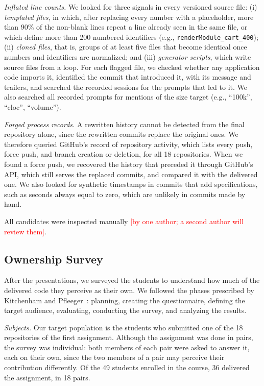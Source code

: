 \documentclass[conference]{IEEEtran}
\newcommand{\tbd}[1]{\textcolor{red}{[#1]}}
\begin{document}
\emph{Inflated line counts.} We looked for three signals in every versioned source file: (i) \emph{templated files}, in which, after replacing every number with a placeholder, more than 90\% of the non-blank lines repeat a line already seen in the same file, or which define more than 200 numbered identifiers (e.g., \texttt{renderModule\_cart\_400}); (ii) \emph{cloned files}, that is, groups of at least five files that become identical once numbers and identifiers are normalized; and (iii) \emph{generator scripts}, which write source files from a loop. For each flagged file, we checked whether any application code imports it, identified the commit that introduced it, with its message and trailers, and searched the recorded sessions for the prompts that led to it. We also searched all recorded prompts for mentions of the size target (e.g., ``100k'', ``cloc'', ``volume'').

\emph{Forged process records.} A rewritten history cannot be detected from the final repository alone, since the rewritten commits replace the original ones. We therefore queried GitHub's record of repository activity, which lists every push, force push, and branch creation or deletion, for all 18 repositories. When we found a force push, we recovered the history that preceded it through GitHub's API, which still serves the replaced commits, and compared it with the delivered one. We also looked for synthetic timestamps in commits that add specifications, such as seconds always equal to zero, which are unlikely in commits made by hand.

All candidates were inspected manually \tbd{by one author; a second author will review them}.

\subsection{Ownership Survey}

After the presentations, we surveyed the students to understand how much of the delivered code they perceive as their own. We followed the phases prescribed by Kitchenham and Pfleeger~\cite{kitchenham2008}: planning, creating the questionnaire, defining the target audience, evaluating, conducting the survey, and analyzing the results.

\emph{Subjects.} Our target population is the students who submitted one of the 18 repositories of the first assignment. Although the assignment was done in pairs, the survey was individual: both members of each pair were asked to answer it, each on their own, since the two members of a pair may perceive their contribution differently. Of the 49 students enrolled in the course, 36 delivered the assignment, in 18 pairs.
\end{document}
